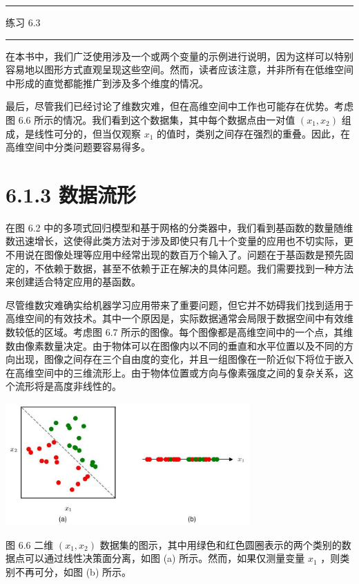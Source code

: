 \documentclass[10pt]{article}
\newcommand{\HRule}{\begin{center}\rule{0.9\linewidth}{0.2mm}\end{center}}
\begin{document}
\HRule

练习 6.3

\HRule

在本书中，我们广泛使用涉及一个或两个变量的示例进行说明，因为这样可以特别容易地以图形方式直观呈现这些空间。然而，读者应该注意，并非所有在低维空间中形成的直觉都能推广到涉及多个维度的情况。

最后，尽管我们已经讨论了维数灾难，但在高维空间中工作也可能存在优势。考虑图 6.6 所示的情况。我们看到这个数据集，其中每个数据点由一对值 \(\left( {{x}_{1},{x}_{2}}\right)\) 组成，是线性可分的，但当仅观察 \({x}_{1}\) 的值时，类别之间存在强烈的重叠。因此，在高维空间中分类问题要容易得多。

\section*{6.1.3 数据流形}

在图 6.2 中的多项式回归模型和基于网格的分类器中，我们看到基函数的数量随维数迅速增长，这使得此类方法对于涉及即使只有几十个变量的应用也不切实际，更不用说在图像处理等应用中经常出现的数百万个输入了。问题在于基函数是预先固定的，不依赖于数据，甚至不依赖于正在解决的具体问题。我们需要找到一种方法来创建适合特定应用的基函数。

尽管维数灾难确实给机器学习应用带来了重要问题，但它并不妨碍我们找到适用于高维空间的有效技术。其中一个原因是，实际数据通常会局限于数据空间中有效维数较低的区域。考虑图 6.7 所示的图像。每个图像都是高维空间中的一个点，其维数由像素数量决定。由于物体可以在图像内以不同的垂直和水平位置以及不同的方向出现，图像之间存在三个自由度的变化，并且一组图像在一阶近似下将位于嵌入在高维空间中的三维流形上。由于物体位置或方向与像素强度之间的复杂关系，这个流形将是高度非线性的。

\begin{center}
\includegraphics[max width=0.7\textwidth]{images/0194e279-9b28-703a-88f4-c3ac21e2010d_196_366_343_985_495_0.jpg}
\end{center}
\hspace*{3em} 

图 6.6 二维 \(\left( {{x}_{1},{x}_{2}}\right)\) 数据集的图示，其中用绿色和红色圆圈表示的两个类别的数据点可以通过线性决策面分离，如图 (a) 所示。然而，如果仅测量变量 \({x}_{1}\) ，则类别不再可分，如图 (b) 所示。
\end{document}
